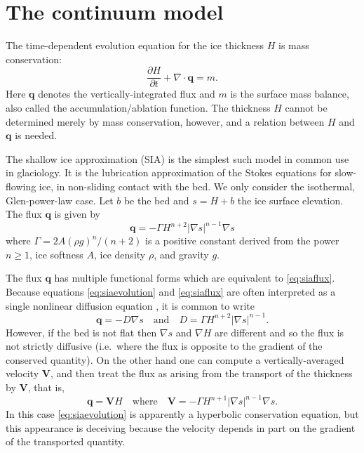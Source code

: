 \documentclass[twocolumn,letterpaper]{igs}
\newcommand\bq{\mathbf{q}}
\newcommand\bV{\mathbf{V}}
\newcommand{\Div}{\nabla\cdot}
\newcommand{\grad}{\nabla}
\begin{document}
\section*{The continuum model}

The time-dependent evolution equation for the ice thickness $H$ is mass conservation:
\begin{equation}
\frac{\partial H}{\partial t} + \Div \bq = m.  \label{eq:siaevolution}
\end{equation}
Here $\bq$ denotes the vertically-integrated flux and $m$ is the surface mass balance, also called the accumulation/ablation function.  The thickness $H$ cannot be determined merely by mass conservation, however, and a relation between $H$ and $\bq$ is needed.

The shallow ice approximation (SIA) is the simplest such model in common use in glaciology.  It is the lubrication approximation \citep{Fowler1997} of the Stokes equations for slow-flowing ice, in non-sliding contact with the bed.  We only consider the isothermal, Glen-power-law \citep{GreveBlatter2009} case.  Let $b$ be the bed and $s = H+b$ the ice surface elevation.  The flux $\bq$ is given by
\begin{equation}
\bq = - \Gamma H^{n+2} |\grad s|^{n-1} \grad s  \label{eq:siaflux}
\end{equation}
where $\Gamma = 2 A (\rho g)^n / (n+2)$ is a positive constant derived from the power $n\ge 1$, ice softness $A$, ice density $\rho$, and gravity $g$.

The flux $\bq$ has multiple functional forms which are equivalent to \eqref{eq:siaflux}.  Because equations \eqref{eq:siaevolution} and \eqref{eq:siaflux} are often interpreted as a single nonlinear diffusion equation \citep{Huybrechtsetal1996}, it is common to write
\begin{equation}
\bq = - D \grad s \quad \text{and} \quad D =  \Gamma H^{n+2} |\grad s|^{n-1}. \label{eq:siafluxdiffusion}
\end{equation}
However, if the bed is not flat then $\grad s$ and $\grad H$ are different and so the flux is not strictly diffusive (i.e.~where the flux is opposite to the gradient of the conserved quantity).  On the other hand one can compute a vertically-averaged velocity $\bV$, and then treat the flux as arising from the transport of the thickness by $\bV$, that is,
\begin{equation}
\bq = \bV H \quad \text{where} \quad \bV = - \Gamma H^{n+1} |\grad s|^{n-1} \grad s. \label{eq:siafluxvelocity}
\end{equation}
In this case \eqref{eq:siaevolution} is apparently a hyperbolic conservation equation, but this appearance is deceiving because the velocity depends in part on the gradient of the transported quantity.
\end{document}
